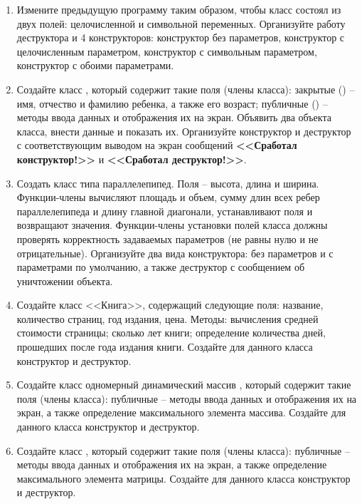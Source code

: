 \begin{enumerate}[leftmargin=*]
\begin{lstlisting}
            cout << "\n@\textcolor{Blue}{***Второй объект***}@" << "\n";
            Number obj@2@(100');
            obj@2@.out_Number(');
            return 0;
        }
    \end{lstlisting}
    \item Измените предыдущую программу таким образом, чтобы класс  состоял из двух полей: целочисленной и символьной переменных. Организуйте работу деструктора и 4 конструкторов: конструктор без параметров, конструктор с целочисленным параметром, конструктор с символьным параметром, конструктор с обоими параметрами. 
    \item Создайте класс , который содержит такие поля (члены класса): закрытые () – имя, отчество и фамилию ребенка, а также его возраст; публичные () – методы ввода данных и отображения их на экран. Объявить два объекта класса, внести данные и показать их. Организуйте конструктор и деструктор с соответствующим выводом на экран сообщений \textbf{<<Сработал конструктор!>>} и \textbf{<<Сработал деструктор!>>}.
    \item Создать класс типа параллелепипед. Поля – высота, длина и ширина. Функции-члены вычисляют площадь и объем, сумму длин всех ребер параллелепипеда и длину главной диагонали, устанавливают поля и возвращают значения. Функции-члены установки полей класса должны проверять корректность задаваемых параметров (не равны нулю и не отрицательные). Организуйте два вида конструктора: без параметров и с параметрами по умолчанию, а также деструктор с сообщением об уничтожении объекта.
    \item Создайте класс <<Книга>>, содержащий следующие поля: название, количество страниц, год издания, цена. Методы: вычисления средней стоимости страницы; сколько лет книги; определение количества дней, прошедших после года издания книги. Создайте для данного класса конструктор и деструктор.
    \item Создайте класс одномерный динамический массив , который содержит такие поля (члены класса): публичные – методы ввода данных и отображения их на экран, а также определение максимального элемента массива. Создайте для данного класса конструктор и деструктор.
    \item Создайте класс , который содержит такие поля (члены класса): публичные – методы ввода данных и отображения их на экран, а также определение максимального элемента матрицы. Создайте для данного класса конструктор и деструктор.
\end{enumerate}

